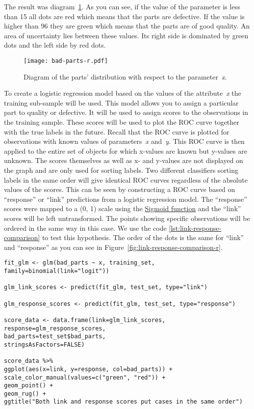 \documentclass[]{scrreprt}
\begin{document}
The result was diagram~\ref{fig:bad-parts-r}. As you can see, if the value of the parameter is less than 15 all dots are red which means that the parts are defective. If the value is higher than 96 they are green which means that the parts are of good quality. An area of uncertainty lies between these values. Its right side is dominated by green dots and the left side by red dots. 
%
\begin{figure}[htp]
	\centering
	\texttt{[image: bad-parts-r.pdf]}
	\caption{Diagram of the parts' distribution with respect to the parameter~\textit{x}.}
	\label{fig:bad-parts-r}
\end{figure}

To create a logistic regression model based on the values of the attribute~\textit{x} the training sub-sample will be used. This model allows you to assign a particular part to quality or defective. It will be used to assign scores to the observations in the training sample. These scores will be used to plot the ROC curve together with the true labels in the future. Recall that the ROC curve is plotted for observations with known values of parameters~\textit{x} and~\textit{y}. This ROC curve is then applied to the entire set of objects for which x-values are known but y-values are unknown. The scores themselves as well as x- and y-values are not displayed on the graph and are only used for sorting labels. Two different classifiers sorting labels in the same order will give identical ROC curves regardless of the absolute values of the scores. This can be seen by constructing a ROC curve based on ``response'' or ``link'' predictions from a logistic regression model. The ``response'' scores were mapped to a (0, 1) scale using the \href{https://en.wikipedia.org/wiki/Sigmoid_function}{Sigmoid function}\cite{Wiki:sigmoid-function} and the ``link'' scores will be left untransformed. The points showing specific observations will be ordered in the same way in this case. We use the code \ref{lst:link-response-comparison} to test this hypothesis. The order of the dots is the same for ``link'' and ``response'' as you can see in Figure~\ref{fig:link-response-comparison-r}.
%
\begin{lstlisting}[float=htp, caption = Comparing "link" and "response" predictions, firstnumber=1, label= lst:link-response-comparison]
fit_glm <- glm(bad_parts ~ x, training_set, family=binomial(link="logit"))

glm_link_scores <- predict(fit_glm, test_set, type="link")

glm_response_scores <- predict(fit_glm, test_set, type="response")

score_data <- data.frame(link=glm_link_scores, 
response=glm_response_scores,
bad_parts=test_set$bad_parts,
stringsAsFactors=FALSE)

score_data %>% 
ggplot(aes(x=link, y=response, col=bad_parts)) + 
scale_color_manual(values=c("green", "red")) + 
geom_point() + 
geom_rug() + 
ggtitle("Both link and response scores put cases in the same order")

\end{lstlisting}
\end{document}
